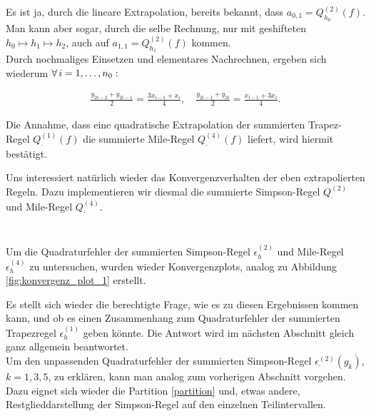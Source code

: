Es ist ja, durch die lineare Extrapolation, bereits bekannt, dass $a_{0,1} = Q_{h_0}^{(2)}(f)$. Man kann aber sogar, durch die selbe Rechnung, nur mit geshifteten $h_0 \mapsto h_1 \mapsto h_2$, auch auf $a_{1,1} = Q_{h_1}^{(2)}(f)$ kommen. \\

Durch nochmaliges Einsetzen und elementares Nachrechnen, ergeben sich wiederum $\forall \, i = 1, \ldots, n_0:$

\begin{align*}
    \frac{y_{2i - 2} + y_{2i - 1}}{2}
    = \frac{3 x_{i-1} + x_i}{4}, \quad
    \frac{y_{2i - 1} + y_{2i}}{2}
    = \frac{x_{i-1} + 3 x_i}{4}.
\end{align*}

Die Annahme, dass eine quadratische Extrapolation der summierten Trapez-Regel $Q_\cdot^{(1)}(f)$ die summierte Mile-Regel $Q_\cdot^{(4)}(f)$ liefert, wird hiermit bestätigt.



Uns interessiert natürlich wieder das Konvergenzverhalten der eben extrapolierten Regeln. Dazu implementieren wir diesmal die summierte Simpson-Regel $Q_\cdot^{(2)}$ und Mile-Regel $Q_\cdot^{(4)}$.

\inputminted{python}{Aufgabe_2/python_code/summierte_simpson_regel.py}
\inputminted{python}{Aufgabe_2/python_code/summierte_mile_regel.py}

Um die Quadraturfehler der summierten Simpson-Regel $\epsilon_h^{(2)}$ und Mile-Regel $\epsilon_h^{(4)}$ zu untersuchen, wurden wieder Konvergenzplots, analog zu Abbildung \ref{fig:konvergenz_plot_1} erstellt.




Es stellt sich wieder die berechtigte Frage, wie es zu diesen Ergebnissen kommen kann, und ob es einen Zusammenhang zum Quadraturfehler der summierten Trapezregel $\epsilon_h^{(1)}$ geben könnte. Die Antwort wird im nächsten Abschnitt gleich ganz allgemein beantwortet. \\

Um den unpassenden Quadraturfehler der summierten Simpson-Regel $\epsilon_\cdot^{(2)}(g_k)$, $k = 1, 3, 5$, zu erklären, kann man analog zum vorherigen Abschnitt vorgehen. Dazu eignet sich wieder die Partition \eqref{partition} und, etwas andere, Restglieddarstellung der Simpson-Regel auf den einzelnen Teilintervallen. \\

